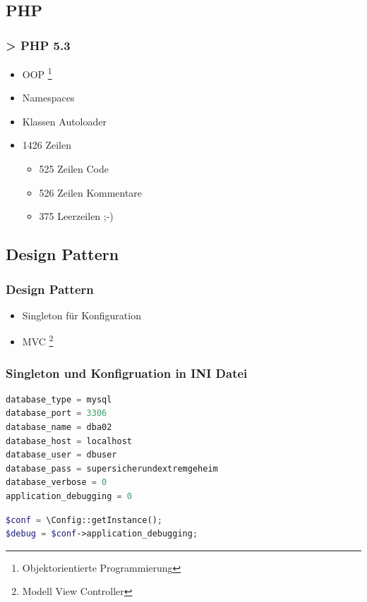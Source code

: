 \documentclass[xcolor=dvipsnames]{beamer}
\begin{document}
\subsection{PHP}
\begin{frame} %
  \frametitle{> PHP 5.3} %
  \begin{block}{}
	  \begin{itemize}
  		\item OOP \footnote{Objektorientierte Programmierung}
		\item Namespaces
  		\item Klassen Autoloader
		\item 1426 Zeilen
		\begin{itemize}
			\item 525 Zeilen Code
			\item 526 Zeilen Kommentare
			\item 375 Leerzeilen ;-)
	        \end{itemize}
	  \end{itemize}
  \end{block} 
\end{frame}

\subsection{Design Pattern}
\begin{frame} %
  \frametitle{Design Pattern} %
  \begin{block}{}
	  \begin{itemize}
  		\item Singleton für Konfiguration
  		\item MVC \footnote{Modell View Controller}
	  \end{itemize}
  \end{block} 
\end{frame}

\begin{frame}[fragile] %
\frametitle{Singleton und Konfigruation in INI Datei} %

\begin{lstlisting}[language=PHP, caption=config.ini]
database_type = mysql
database_port = 3306
database_name = dba02
database_host = localhost
database_user = dbuser
database_pass = supersicherundextremgeheim
database_verbose = 0
application_debugging = 0
\end{lstlisting} 

\begin{lstlisting}[language=PHP, caption=Config Klasse]
$conf = \Config::getInstance();
$debug = $conf->application_debugging;
\end{lstlisting} 

\end{frame}
\end{document}
